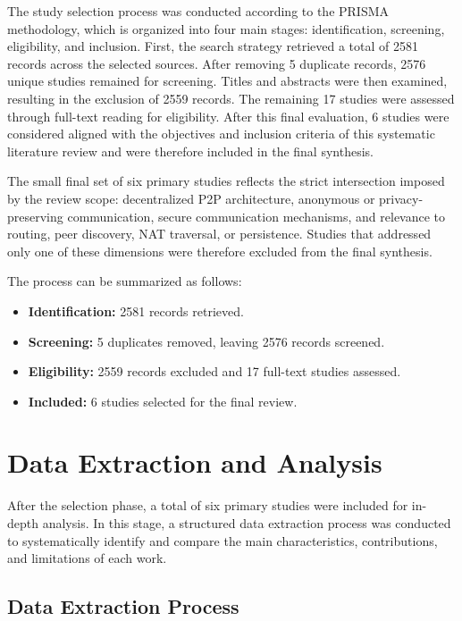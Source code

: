 \documentclass[
  12pt,
  oneside,
  a4paper,
  chapter=TITLE,
  section=TITLE,
  english,
  brazil
]{abntex2}
\begin{document}
\thesisprismatikz

The study selection process was conducted according to the PRISMA methodology, which is organized into four main stages: identification, screening, eligibility, and inclusion. First, the search strategy retrieved a total of 2581 records across the selected sources. After removing 5 duplicate records, 2576 unique studies remained for screening. Titles and abstracts were then examined, resulting in the exclusion of 2559 records. The remaining 17 studies were assessed through full-text reading for eligibility. After this final evaluation, 6 studies were considered aligned with the objectives and inclusion criteria of this systematic literature review and were therefore included in the final synthesis.

The small final set of six primary studies reflects the strict intersection imposed by the review scope: decentralized P2P architecture, anonymous or privacy-preserving communication, secure communication mechanisms, and relevance to routing, peer discovery, NAT traversal, or persistence. Studies that addressed only one of these dimensions were therefore excluded from the final synthesis.

The process can be summarized as follows:

\begin{itemize}
    \item \textbf{Identification:} 2581 records retrieved.
    \item \textbf{Screening:} 5 duplicates removed, leaving 2576 records screened.
    \item \textbf{Eligibility:} 2559 records excluded and 17 full-text studies assessed.
    \item \textbf{Included:} 6 studies selected for the final review.
\end{itemize}



\chapter{Data Extraction and Analysis}

After the selection phase, a total of six primary studies were included for in-depth analysis. In this stage, a structured data extraction process was conducted to systematically identify and compare the main characteristics, contributions, and limitations of each work.

\section{Data Extraction Process}
\end{document}
